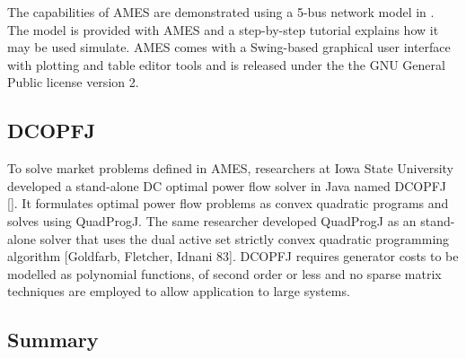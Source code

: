 The capabilities of AMES are demonstrated using a 5-bus network model in
\cite{tesfatsi:pes09}.  The model is provided with AMES and a step-by-step
tutorial explains how it may be used simulate.  AMES comes with a
Swing-based graphical user interface with plotting and table editor tools and
is released under the the GNU General Public license version 2.

\subsection{DCOPFJ}
\label{sec:dcopfj}
To solve market problems defined in AMES, researchers at Iowa State University
developed a stand-alone DC optimal power flow solver in Java named DCOPFJ [].
It formulates optimal power flow problems as convex quadratic programs and
solves using QuadProgJ.  The same researcher developed QuadProgJ as an
stand-alone solver that uses the dual active set strictly convex quadratic
programming algorithm [Goldfarb, Fletcher, Idnani 83].  DCOPFJ requires
generator costs to be modelled as polynomial functions, of second order or
less and no sparse matrix techniques are employed to allow application to large
systems.


\subsection{Summary}
